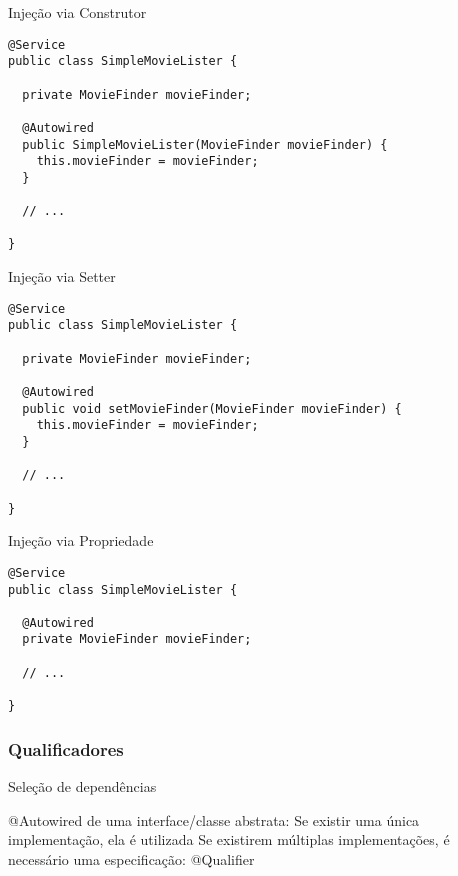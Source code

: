 \documentclass{beamer}
\begin{document}
\begin{frame}[fragile]{Injeção via Construtor}
 \begin{verbatim}
@Service
public class SimpleMovieLister {

  private MovieFinder movieFinder;

  @Autowired
  public SimpleMovieLister(MovieFinder movieFinder) {
    this.movieFinder = movieFinder;
  }

  // ...
  
}
  \end{verbatim}
\end{frame}

\begin{frame}[fragile]{Injeção via Setter}
 \begin{verbatim}
@Service
public class SimpleMovieLister {

  private MovieFinder movieFinder;
  
  @Autowired
  public void setMovieFinder(MovieFinder movieFinder) {
    this.movieFinder = movieFinder;
  }

  // ...
  
}
  \end{verbatim}
\end{frame}

\begin{frame}[fragile]{Injeção via Propriedade}
 \begin{verbatim}
@Service
public class SimpleMovieLister {

  @Autowired
  private MovieFinder movieFinder;

  // ...
  
}
  \end{verbatim}
\end{frame}

\subsubsection{Qualificadores}

\begin{frame}{Seleção de dependências}
 \begin{outline}
   @Autowired de uma interface/classe abstrata:
    \2 Se existir uma única implementação, ela é utilizada
    \2 Se existirem múltiplas implementações, é necessário uma especificação: \alert{@Qualifier}
 \end{outline}
\end{frame}
\end{document}

